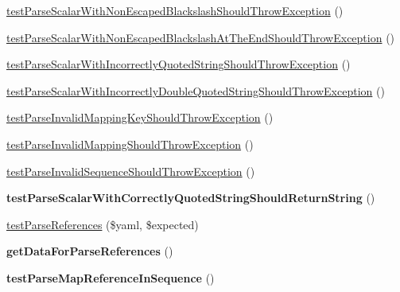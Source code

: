 \begin{DoxyCompactItemize}
\item 
\hyperlink{class_symfony_1_1_component_1_1_yaml_1_1_tests_1_1_inline_test_a08d68bf6daeaf14da1d7a34784e5885d}{test\+Parse\+Scalar\+With\+Non\+Escaped\+Blackslash\+Should\+Throw\+Exception} ()
\item 
\hyperlink{class_symfony_1_1_component_1_1_yaml_1_1_tests_1_1_inline_test_a4c1cda3efc4c142810f87a69035ad5cc}{test\+Parse\+Scalar\+With\+Non\+Escaped\+Blackslash\+At\+The\+End\+Should\+Throw\+Exception} ()
\item 
\hyperlink{class_symfony_1_1_component_1_1_yaml_1_1_tests_1_1_inline_test_a3f3b061ccefc52a84943826a4314e459}{test\+Parse\+Scalar\+With\+Incorrectly\+Quoted\+String\+Should\+Throw\+Exception} ()
\item 
\hyperlink{class_symfony_1_1_component_1_1_yaml_1_1_tests_1_1_inline_test_a8f820b5e7ada70c5f054eb1396a00fe9}{test\+Parse\+Scalar\+With\+Incorrectly\+Double\+Quoted\+String\+Should\+Throw\+Exception} ()
\item 
\hyperlink{class_symfony_1_1_component_1_1_yaml_1_1_tests_1_1_inline_test_ab6c60d5afd7bd8ab17151f8f00639061}{test\+Parse\+Invalid\+Mapping\+Key\+Should\+Throw\+Exception} ()
\item 
\hyperlink{class_symfony_1_1_component_1_1_yaml_1_1_tests_1_1_inline_test_a9950836fa990a0ab5d1450bf095ce9f0}{test\+Parse\+Invalid\+Mapping\+Should\+Throw\+Exception} ()
\item 
\hyperlink{class_symfony_1_1_component_1_1_yaml_1_1_tests_1_1_inline_test_aa9380d52f70e419a4acad13e590546ed}{test\+Parse\+Invalid\+Sequence\+Should\+Throw\+Exception} ()
\item 
{\bfseries test\+Parse\+Scalar\+With\+Correctly\+Quoted\+String\+Should\+Return\+String} ()\hypertarget{class_symfony_1_1_component_1_1_yaml_1_1_tests_1_1_inline_test_ab1755bc0fab8c4634d386880362011d4}{}\label{class_symfony_1_1_component_1_1_yaml_1_1_tests_1_1_inline_test_ab1755bc0fab8c4634d386880362011d4}

\item 
\hyperlink{class_symfony_1_1_component_1_1_yaml_1_1_tests_1_1_inline_test_af3ffae0ff4f463239a0b40e242bf6fb2}{test\+Parse\+References} (\$yaml, \$expected)
\item 
{\bfseries get\+Data\+For\+Parse\+References} ()\hypertarget{class_symfony_1_1_component_1_1_yaml_1_1_tests_1_1_inline_test_af2b8439eb5e7144cb89fa6019ea9ef72}{}\label{class_symfony_1_1_component_1_1_yaml_1_1_tests_1_1_inline_test_af2b8439eb5e7144cb89fa6019ea9ef72}

\item 
{\bfseries test\+Parse\+Map\+Reference\+In\+Sequence} ()\hypertarget{class_symfony_1_1_component_1_1_yaml_1_1_tests_1_1_inline_test_aa08a0e30625487414e42d496adabfc9f}{}\label{class_symfony_1_1_component_1_1_yaml_1_1_tests_1_1_inline_test_aa08a0e30625487414e42d496adabfc9f}


\end{DoxyCompactItemize}
